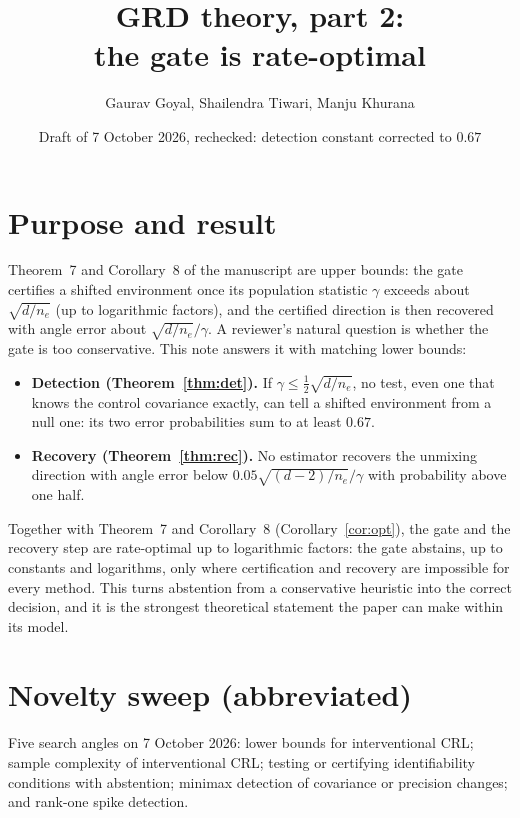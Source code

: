 \documentclass[11pt]{article}
\title{GRD theory, part 2:\\ the gate is rate-optimal}
\author{Gaurav Goyal, Shailendra Tiwari, Manju Khurana}
\date{Draft of 7 October 2026, rechecked: detection constant corrected to $0.67$}
\begin{document}
\maketitle

\section*{Purpose and result}

Theorem~7 and Corollary~8 of the manuscript are upper bounds: the gate certifies a shifted environment once its population statistic $\gamma$ exceeds about $\sqrt{d/n_e}$ (up to logarithmic factors), and the certified direction is then recovered with angle error about $\sqrt{d/n_e}/\gamma$. A reviewer's natural question is whether the gate is too conservative. This note answers it with matching lower bounds:
\begin{itemize}
  \item \textbf{Detection (Theorem~\ref{thm:det}).} If $\gamma\le\tfrac12\sqrt{d/n_e}$, no test, even one that knows the control covariance exactly, can tell a shifted environment from a null one: its two error probabilities sum to at least $0.67$.
  \item \textbf{Recovery (Theorem~\ref{thm:rec}).} No estimator recovers the unmixing direction with angle error below $0.05\sqrt{(d-2)/n_e}/\gamma$ with probability above one half.
\end{itemize}
Together with Theorem~7 and Corollary~8 (Corollary~\ref{cor:opt}), the gate and the recovery step are rate-optimal up to logarithmic factors: the gate abstains, up to constants and logarithms, only where certification and recovery are impossible for every method. This turns abstention from a conservative heuristic into the correct decision, and it is the strongest theoretical statement the paper can make within its model.

\section{Novelty sweep (abbreviated)}

Five search angles on 7 October 2026: lower bounds for interventional CRL; sample complexity of interventional CRL; testing or certifying identifiability conditions with abstention; minimax detection of covariance or precision changes; and rank-one spike detection.
\end{document}
